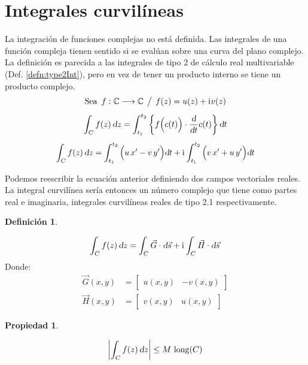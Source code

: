 \documentclass[a5paper,12pt,twoside]{book}
\newtheorem{defn}{{Definición}}[chapter]
\newtheorem{prop}{{Propiedad}}[chapter]
\begin{document}
\section{Integrales curvilíneas}

La integración de funciones complejas no está definida. Las integrales de una función compleja tienen sentido si se evalúan sobre una curva del plano complejo. La definición es parecida a las integrales de tipo 2 de cálculo real multivariable (Def. \ref{defn:type2Int}), pero en vez de tener un producto interno se tiene un producto complejo.
\begin{gather*}
    \textrm{Sea} \enspace f: \setC \longrightarrow \setC \tq f(z) = u(z) + \iu v(z)
    \\[1ex]
    \int_{C} f(z) \, \dif z = \int_{t_1}^{t_2} \left\{ f \Big( c(t) \Big) \cdot \frac{\dif}{\dif t} c(t) \right\} \dif t
    \\[1ex]
    \scale{0.98}{
    \int_{C} f(z) \, \dif z = \int_{t_1}^{t_2} \Big( u \, x' - v \, y' \Big) \dif t + \iu \int_{t_1}^{t_2} \Big( v \, x' + u \, y' \Big) \dif t
    }
\end{gather*}

Podemos reescribir la ecuación anterior definiendo dos campos vectoriales reales. La integral curvilínea sería entonces un número complejo que tiene como partes real e imaginaria, integrales curvilíneas reales de tipo 2.1 respectivamente.

\begin{mdframed}[style=MyFrame1]
    \begin{defn}
        \label{defn:integral}
    \end{defn}
    \begin{equation*}
        \int_{C} f(z) \, \textsl{d} z = \int_{C} \Vec{G} \cdot \textsl{d} \Vec{s} + \mathrm{i}\mkern1mu \int_{C} \Vec{H} \cdot \textsl{d} \Vec{s}
    \end{equation*}
    Donde:
    \begin{align*}
        \Vec{G}(x,y) &= \begin{bmatrix} u(x,y) & -v(x,y) \end{bmatrix}
        \\
        \Vec{H}(x,y) &= \begin{bmatrix} v(x,y) & u(x,y) \end{bmatrix}
    \end{align*}
\end{mdframed}

\begin{mdframed}[style=MyFrame1]
    \begin{prop}
    \end{prop}
    \begin{equation*}
        {\left| {\int_C f(z) \, \textsl{d}z} \right|} \leq M \, \operatorname{long}(C)
    \end{equation*}
\end{mdframed}
\end{document}
